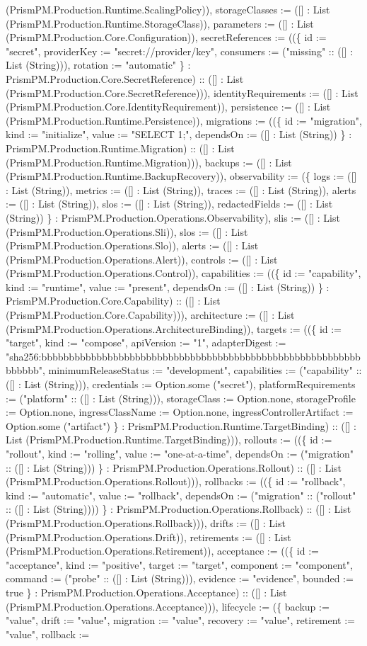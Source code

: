 \documentclass[11pt]{article}
\begin{document}
(PrismPM.Production.Runtime.ScalingPolicy)), storageClasses := ([] : List (PrismPM.Production.Runtime.StorageClass)), parameters := ([] : List (PrismPM.Production.Core.Configuration)), secretReferences := ((\{ id := "secret", providerKey := "secret://provider/key", consumers := ("missing" :: ([] : List (String))), rotation := "automatic" \} : PrismPM.Production.Core.SecretReference) :: ([] : List (PrismPM.Production.Core.SecretReference))), identityRequirements := ([] : List (PrismPM.Production.Core.IdentityRequirement)), persistence := ([] : List (PrismPM.Production.Runtime.Persistence)), migrations := ((\{ id := "migration", kind := "initialize", value := "SELECT 1;", dependsOn := ([] : List (String)) \} : PrismPM.Production.Runtime.Migration) :: ([] : List (PrismPM.Production.Runtime.Migration))), backups := ([] : List (PrismPM.Production.Runtime.BackupRecovery)), observability := (\{ logs := ([] : List (String)), metrics := ([] : List (String)), traces := ([] : List (String)), alerts := ([] : List (String)), slos := ([] : List (String)), redactedFields := ([] : List (String)) \} : PrismPM.Production.Operations.Observability), slis := ([] : List (PrismPM.Production.Operations.Sli)), slos := ([] : List (PrismPM.Production.Operations.Slo)), alerts := ([] : List (PrismPM.Production.Operations.Alert)), controls := ([] : List (PrismPM.Production.Operations.Control)), capabilities := ((\{ id := "capability", kind := "runtime", value := "present", dependsOn := ([] : List (String)) \} : PrismPM.Production.Core.Capability) :: ([] : List (PrismPM.Production.Core.Capability))), architecture := ([] : List (PrismPM.Production.Operations.ArchitectureBinding)), targets := ((\{ id := "target", kind := "compose", apiVersion := "1", adapterDigest := "sha256:bbbbbbbbbbbbbbbbbbbbbbbbbbbbbbbbbbbbbbbbbbbbbbbbbbbbbbbbbbbbbbbb", minimumReleaseStatus := "development", capabilities := ("capability" :: ([] : List (String))), credentials := Option.some ("secret"), platformRequirements := ("platform" :: ([] : List (String))), storageClass := Option.none, storageProfile := Option.none, ingressClassName := Option.none, ingressControllerArtifact := Option.some ("artifact") \} : PrismPM.Production.Runtime.TargetBinding) :: ([] : List (PrismPM.Production.Runtime.TargetBinding))), rollouts := ((\{ id := "rollout", kind := "rolling", value := "one-at-a-time", dependsOn := ("migration" :: ([] : List (String))) \} : PrismPM.Production.Operations.Rollout) :: ([] : List (PrismPM.Production.Operations.Rollout))), rollbacks := ((\{ id := "rollback", kind := "automatic", value := "rollback", dependsOn := ("migration" :: ("rollout" :: ([] : List (String)))) \} : PrismPM.Production.Operations.Rollback) :: ([] : List (PrismPM.Production.Operations.Rollback))), drifts := ([] : List (PrismPM.Production.Operations.Drift)), retirements := ([] : List (PrismPM.Production.Operations.Retirement)), acceptance := ((\{ id := "acceptance", kind := "positive", target := "target", component := "component", command := ("probe" :: ([] : List (String))), evidence := "evidence", bounded := true \} : PrismPM.Production.Operations.Acceptance) :: ([] : List (PrismPM.Production.Operations.Acceptance))), lifecycle := (\{ backup := "value", drift := "value", migration := "value", recovery := "value", retirement := "value", rollback := 
\end{document}
